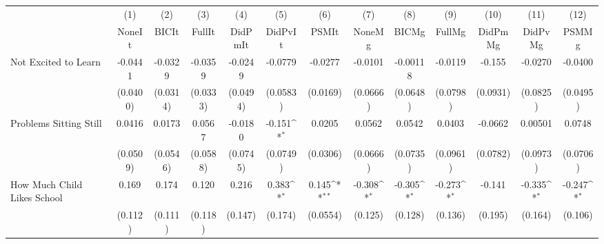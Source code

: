 {
\def\sym#1{\ifmmode^{#1}\else\(^{#1}\)\fi}
\begin{tabular}{l*{12}{c}}
\toprule
            &\multicolumn{1}{c}{(1)}&\multicolumn{1}{c}{(2)}&\multicolumn{1}{c}{(3)}&\multicolumn{1}{c}{(4)}&\multicolumn{1}{c}{(5)}&\multicolumn{1}{c}{(6)}&\multicolumn{1}{c}{(7)}&\multicolumn{1}{c}{(8)}&\multicolumn{1}{c}{(9)}&\multicolumn{1}{c}{(10)}&\multicolumn{1}{c}{(11)}&\multicolumn{1}{c}{(12)}\\
            &\multicolumn{1}{c}{NoneIt}&\multicolumn{1}{c}{BICIt}&\multicolumn{1}{c}{FullIt}&\multicolumn{1}{c}{DidPmIt}&\multicolumn{1}{c}{DidPvIt}&\multicolumn{1}{c}{PSMIt}&\multicolumn{1}{c}{NoneMg}&\multicolumn{1}{c}{BICMg}&\multicolumn{1}{c}{FullMg}&\multicolumn{1}{c}{DidPmMg}&\multicolumn{1}{c}{DidPvMg}&\multicolumn{1}{c}{PSMMg}\\
\midrule
Not Excited to Learn&     -0.0441         &     -0.0329         &     -0.0359         &     -0.0249         &     -0.0779         &     -0.0277         &     -0.0101         &    -0.00118         &     -0.0119         &      -0.155         &     -0.0270         &     -0.0400         \\
            &    (0.0400)         &    (0.0314)         &    (0.0333)         &    (0.0494)         &    (0.0583)         &    (0.0169)         &    (0.0666)         &    (0.0648)         &    (0.0798)         &    (0.0931)         &    (0.0825)         &    (0.0495)         \\
\addlinespace
Problems Sitting Still&      0.0416         &      0.0173         &      0.0567         &     -0.0180         &      -0.151\sym{*}  &      0.0205         &      0.0562         &      0.0542         &      0.0403         &     -0.0662         &     0.00501         &      0.0748         \\
            &    (0.0509)         &    (0.0546)         &    (0.0588)         &    (0.0745)         &    (0.0749)         &    (0.0306)         &    (0.0666)         &    (0.0735)         &    (0.0961)         &    (0.0782)         &    (0.0973)         &    (0.0706)         \\
\addlinespace
How Much Child Likes School&       0.169         &       0.174         &       0.120         &       0.216         &       0.383\sym{*}  &       0.145\sym{**} &      -0.308\sym{*}  &      -0.305\sym{*}  &      -0.273\sym{*}  &      -0.141         &      -0.335\sym{*}  &      -0.247\sym{*}  \\
            &     (0.112)         &     (0.111)         &     (0.118)         &     (0.147)         &     (0.174)         &    (0.0554)         &     (0.125)         &     (0.128)         &     (0.136)         &     (0.195)         &     (0.164)         &     (0.106)         \\

\end{tabular}}

